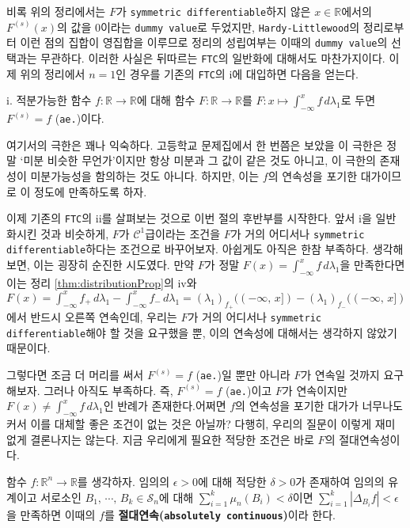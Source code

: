 비록 위의 정리에서는 $F$가 \texttt{symmetric differentiable}하지 않은 $x\in\mathbb{R}$에서의 $F^{(s)}(x)$의 값을 $0$이라는 \texttt{dummy value}로 두었지만, \texttt{Hardy-Littlewood}의 정리로부터 이런 점의 집합이 영집합을 이루므로 정리의 성립여부는 이때의 \texttt{dummy value}의 선택과는 무관하다. 이러한 사실은 뒤따르는 \texttt{FTC}의 일반화에 대해서도 마찬가지이다. 이제 위의 정리에서 $n=1$인 경우를 기존의 \texttt{FTC}의 i에 대입하면 다음을 얻는다.

\vspace{6pt}
 i. 적분가능한 함수 $f:\mathbb{R}\to\mathbb{R}$에 대해 함수 $F:\mathbb{R}\to\mathbb{R}$를 $F:x\mapsto\int_{-\infty}^xf\,d\lambda_1$로 두면 $F^{(s)}=f$ (\texttt{ae.})이다.

\vspace{6pt}
여기서의 극한은 꽤나 익숙하다. 고등학교 문제집에서 한 번쯤은 보았을 이 극한은 정말 `미분 비슷한 무언가'이지만 항상 미분과 그 값이 같은 것도 아니고, 이 극한의 존재성이 미분가능성을 함의하는 것도 아니다. 하지만, 이는 $f$의 연속성을 포기한 대가이므로 이 정도에 만족하도록 하자.

이제 기존의 \texttt{FTC}의 ii를 살펴보는 것으로 이번 절의 후반부를 시작한다. 앞서 i을 일반화시킨 것과 비슷하게, $F$가 $\mathcal{C}^1$급이라는 조건을 $F$가 거의 어디서나 \texttt{symmetric differentiable}하다는 조건으로 바꾸어보자. 아쉽게도 아직은 한참 부족하다. 생각해보면, 이는 굉장히 순진한 시도였다. 만약 $F$가 정말 $F(x)=\int_{-\infty}^xf\,d\lambda_1$을 만족한다면 이는 정리 \ref{thm:distributionProp}의 iv와 $F(x)=\int_{-\infty}^xf_+\,d\lambda_1-\int_{-\infty}^xf_-\,d\lambda_1=(\lambda_1)_{f_+}((-\infty,\,x])-(\lambda_1)_{f_-}((-\infty,\,x])$에서 반드시 오른쪽 연속인데, 우리는 $F$가 거의 어디서나 \texttt{symmetric differentiable}해야 할 것을 요구했을 뿐, 이의 연속성에 대해서는 생각하지 않았기 때문이다.

그렇다면 조금 더 머리를 써서 $F^{(s)}=f$ (\texttt{ae.})일 뿐만 아니라 $F$가 연속일 것까지 요구해보자. 그러나 아직도 부족하다. 즉, $F^{(s)}=f$ (\texttt{ae.})이고 $F$가 연속이지만 $F(x)\ne\int_{-\infty}^xf\,d\lambda_1$인 반례가 존재한다.\footnotemark 어쩌면 $f$의 연속성을 포기한 대가가 너무나도 커서 이를 대체할 좋은 조건이 없는 것은 아닐까? 다행히, 우리의 질문이 이렇게 재미없게 결론나지는 않는다. 지금 우리에게 필요한 적당한 조건은 바로 $F$의 절대연속성이다.

\begin{definition}
    함수 $f:\mathbb{R}^n\to\mathbb{R}$를 생각하자. 임의의 $\epsilon>0$에 대해 적당한 $\delta>0$가 존재하여 임의의 유계이고 서로소인 $B_1,\,\cdots,\,B_k\in\mathcal{S}_n$에 대해 $\sum_{i=1}^k\mu_n(B_i)<\delta$이면 $\sum_{i=1}^k|\Delta_{B_i}f|<\epsilon$을 만족하면 이때의 $f$를 \textbf{절대연속(\texttt{absolutely continuous})}이라 한다.
\end{definition}

